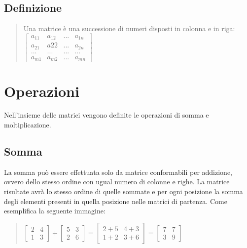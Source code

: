 \documentclass[a4paper]{article}
\begin{document}
\subsection{Definizione}

\vspace*{\fill} 
\begin{quote} 
\centering 
Una matrice è una successione di numeri disposti in colonna e in riga:
\bigskip \\
$\left[\begin{matrix}a_{11} & a_{12} & ... & a_{1n} \\ a_{21} & a{22} & ... & a_{2n} \\ ... & ... & ... & ...\\ a_{m1} & a_{m2} & ... & a_{mn}\end{matrix}\right]
$
\end{quote}
\vspace*{\fill}

\section{Operazioni}
Nell'insieme delle matrici vengono definite le operazioni di somma e moltiplicazione.

\subsection{Somma}
La somma può essere effettuata solo da matrice conformabili per addizione, ovvero dello stesso ordine con ugual numero di colonne e righe. La matrice risultate avrà lo stesso ordine di quelle sommate e per ogni posizione la somma degli elementi presenti in quella posizione nelle matrici di partenza. Come esemplifica la seguente immagine:
\\
\begin{quote} \centering $\left[\begin{matrix}2 & 4 \\ 1 & 3\end{matrix}\right] + \left[\begin{matrix}5 & 3 \\ 2 & 6\end{matrix}\right] = \left[\begin{matrix} 2+5 & 4+3 \\ 1+2 & 3+6\end{matrix}\right] = \left[\begin{matrix}7 & 7 \\ 3 & 9\end{matrix}\right]
$\end{quote}
\end{document}
